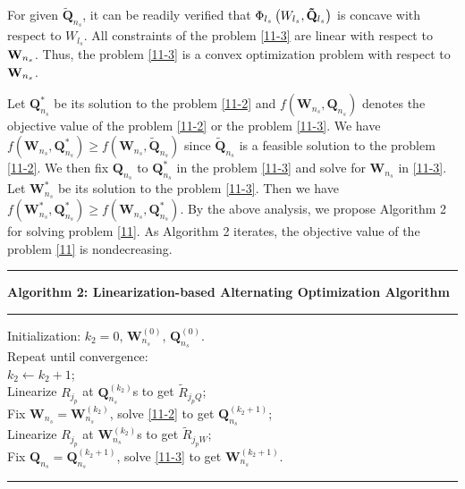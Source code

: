 \documentclass[12pt,onecolumn,tworows]{IEEEtran}
\begin{document}
For given $\mathbf{\tilde Q}_{n_s}$,  it can be readily verified that
${\Phi _{{l_s}}}\left( {{{{{W}}}_{{l_s}}},{{\bf{\tilde Q}}_{{l_s}}}} \right)$ is concave with respect to
 ${{W}_{{l_s}}}$. All constraints of the problem \eqref{11-3} are linear with respect to
 ${{\bf{W}}_{{n_s}}}$. Thus, the problem \eqref{11-3} is a convex optimization problem with respect to
 ${{\bf{W}}_{{n_s}}}$.


 Let $\mathbf{Q}_{n_s}^*$ be its solution to the problem \eqref{11-2} and $f(\mathbf{W}_{n_s}, \mathbf{Q}_{n_s})$ denotes the objective value of the problem \eqref{11-2} or the problem \eqref{11-3}. We have $f(\mathbf{W}_{n_s}, \mathbf{Q}_{n_s}^*)\geq f(\mathbf{W}_{n_s}, \tilde{\mathbf{Q}}_{n_s})$ since $\tilde{\mathbf{Q}}_{n_s}$ is a feasible solution to the problem \eqref{11-2}. We then fix $\mathbf{Q}_{n_s}$ to $\mathbf{Q}_{n_s}^*$ in the problem \eqref{11-3} and solve for $\mathbf{W}_{n_s}$ in \eqref{11-3}. Let $\mathbf{W}_{n_s}^*$ be its solution to the problem \eqref{11-3}. Then we have $f(\mathbf{W}_{n_s}^*, \mathbf{Q}_{n_s}^*)\geq f(\mathbf{W}_{n_s}, \mathbf{Q}_{n_s}^*)$. By the above analysis, we propose Algorithm 2 for solving problem \eqref{11}.
As Algorithm 2 iterates, the objective value of the problem \eqref{11} is nondecreasing.


\noindent\rule{520pt}{1pt}
 \textbf{Algorithm 2: Linearization-based Alternating Optimization Algorithm}\\
 \noindent\rule{520pt}{0.65pt}
Initialization: $k_2=0$, ${\mathbf{W}}_{{n_s}}^{(0)}$, ${\mathbf{Q}}_{{n_s}}^{(0)}$.\\
Repeat until convergence:\\
 \indent  \indent $k_{2} \leftarrow k_{2}+1$;\\
\indent \indent  Linearize $R_{j_p}$ at $\mathbf{Q}_{n_s}^{(k_{2})}$s to get $\tilde{R}_{j_pQ}$;\\
\indent \indent  Fix ${{\mathbf{W}}_{{n_s}}}= {\mathbf{W}}_{{n_s}}^{(k_{2})}$, solve \eqref{11-2} to get ${\mathbf{Q}}_{{n_s}}^{(k_{2} + 1)}$;\\
\indent \indent  Linearize $R_{j_p}$ at $\mathbf{W}_{n_s}^{(k_{2})}$s to get $\tilde{R}_{j_pW}$;\\
\indent \indent  Fix ${{\mathbf{Q}}_{{n_s}}} = {\mathbf{Q}}_{{n_s}}^{(k_{2} + 1)}$, solve \eqref{11-3} to get ${\mathbf{W}}_{{n_s}}^{(k_{2}+1)}$.\\
 \noindent\rule{520pt}{1pt}
\end{document}
